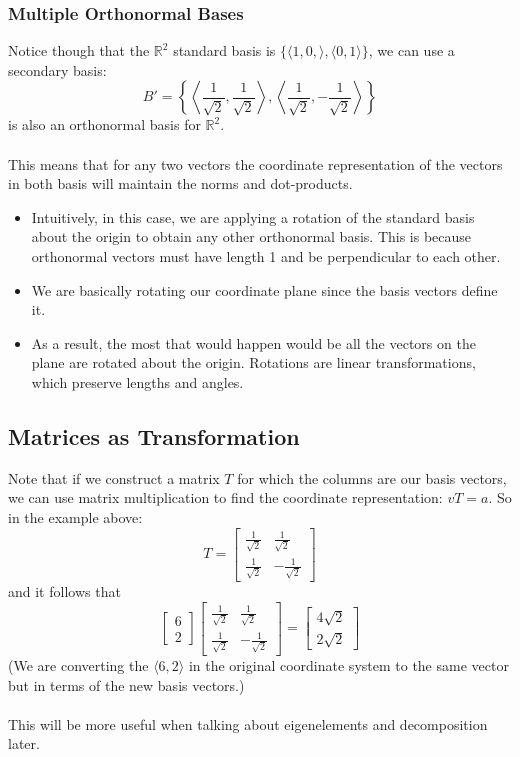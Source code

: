 \documentclass[10pt]{article}
\begin{document}
\subsubsection*{Multiple Orthonormal Bases}
Notice though that the $\mathbb{R}^2$ standard basis is $\{\langle 1, 0, \rangle, \langle 0, 1 \rangle\}$, we can use a secondary basis:
\[B' = \left\{\left\langle \frac{1}{\sqrt{2}}, \frac{1}{\sqrt{2}}\right\rangle, \left\langle \frac{1}{\sqrt{2}}, -\frac{1}{\sqrt{2}}\right\rangle\right\}\]
is also an orthonormal basis for $\mathbb{R}^2$.\\\\
This means that for any two vectors the coordinate representation of the vectors in both basis will maintain the norms and dot-products.
\begin{itemize}
	\item Intuitively, in this case, we are applying a rotation of the standard basis about the origin to obtain any other orthonormal basis.  This is because orthonormal vectors must have length 1 and be perpendicular to each other.
	\item We are basically rotating our coordinate plane since the basis vectors define it.
	\item As a result, the most that would happen would be all the vectors on the plane are rotated about the origin.  Rotations are linear transformations, which preserve lengths and angles.
\end{itemize}

\subsection*{Matrices as Transformation}
Note that if we construct a matrix $T$ for which the columns are our basis vectors, we can use matrix multiplication to find the coordinate representation: $vT = a$.  So in the example above:
\[T = \begin{bmatrix} \frac{1}{\sqrt{2}} & \frac{1}{\sqrt{2}} \\ \frac{1}{\sqrt{2}} & -\frac{1}{\sqrt{2}} \end{bmatrix}\]
and it follows that 
\[\begin{bmatrix} 6 \\ 2 \end{bmatrix} \begin{bmatrix} \frac{1}{\sqrt{2}} & \frac{1}{\sqrt{2}} \\ \frac{1}{\sqrt{2}} & -\frac{1}{\sqrt{2}} \end{bmatrix} = \begin{bmatrix} 4\sqrt{2} \\ 2\sqrt{2} \end{bmatrix}\]
(We are converting the $\langle 6, 2 \rangle$ in the original coordinate system to the same vector but in terms of the new basis vectors.)\\\\
This will be more useful when talking about eigenelements and decomposition later.
\end{document}
